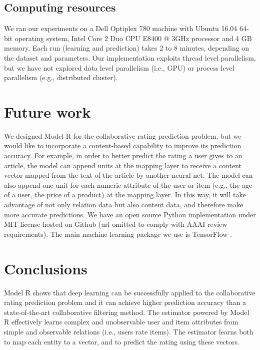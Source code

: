 \documentclass[letterpaper]{article}
\begin{document}
\subsection{Computing resources}
We ran our experiments on a Dell Optiplex 780 machine with Ubuntu 16.04 64-bit 
operating system, Intel Core 2 Duo CPU E8400 @ 3GHz processor and 4 GB memory.
Each run (learning and prediction) takes 2 to 8 minutes,
depending on the dataset and parameters.
Our implementation exploits thread level parallelism, but we have not explored 
data level parallelism (i.e., GPU) or process level parallelism (e.g., 
distributed cluster).

\section{Future work}
We designed Model R for the collaborative rating prediction problem,
but we would like to incorporate a content-based capability to improve its 
prediction accuracy.
For example, in order to better predict the rating a user gives to an article,
the model can append units at the mapping layer to receive a content vector 
mapped from the text of the article by another neural net.
The model can also append one unit for each numeric attribute of the user or 
item (e.g., the age of a user, the price of a product) at the mapping layer.
In this way, it will take advantage of not only relation data but also content 
data, and therefore make more accurate predictions.
We have an open source Python implementation under MIT license hosted on Github 
(url omitted to comply with AAAI review requirements).
The main machine learning package we use is TensorFlow 
\cite{abadi2016tensorflow}.

\section{Conclusions}
Model R shows that deep learning can be successfully applied to the 
collaborative rating prediction problem
and it can achieve higher prediction accuracy than a state-of-the-art 
collaborative filtering method.
The estimator powered by Model R effectively learns complex and unobservable 
user and item attributes from simple and observable relations (i.e., users rate 
items).
The estimator learns both to map each entity to a vector, and to predict 
the rating using these vectors.



\end{document}
